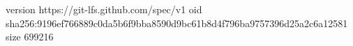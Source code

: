 version https://git-lfs.github.com/spec/v1
oid sha256:9196ef766889c0da5b6f9bba8590d9bc61b8d4f796ba9757396d25a2c6a12581
size 699216
